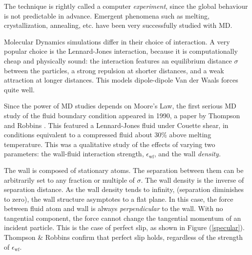\documentclass[12pt, a4paper, twoside, openright]{book}
\newcommand{\ewf}{\ensuremath{\epsilon_{\mathrm{wf}}}}
\begin{document}
The technique is rightly called a computer \emph{experiment}, since the global behaviour is not predictable in advance.  Emergent phenomena such as melting, crystallization, annealing, etc. have been very successfully studied with MD.

Molecular Dynamics simulations differ in their choice of interaction. A very popular choice is the Lennard-Jones interaction, because it is computationally cheap and physically sound: the interaction features an equilibrium distance $\sigma$ between the particles, a strong repulsion at shorter distances, and a weak attraction at longer distances.  This models dipole-dipole Van der Waals forces quite well.

\vspace*{1em}

Since the power of MD studies depends on Moore's Law, the first serious MD study of the fluid boundary condition appeared in 1990, a paper %
by Thompson and Robbins \cite{ThompsonRobbins1990}.
This featured a Lennard-Jones fluid under Couette shear, in conditions equivalent to a compressed fluid about 30\% above melting temperature. This was a qualitative study of the effects of varying two parameters: the wall-fluid interaction strength, \ewf, and the wall \emph{density.}

The wall is composed of stationary atoms. The separation between them can be arbitrarily set to any fraction or multiple of $\sigma$. The wall density is the inverse of separation distance. As the wall density tends to infinity, (separation diminishes to zero), the wall structure asymptotes to a flat plane. In this case, the force between fluid atom and wall is always \emph{perpendicular} to the wall. 
With no tangential component, the force cannot change the tangential momentum of an incident particle.  This is the case of perfect slip, as shown in Figure (\ref{specular}).
Thompson \& Robbins confirm that perfect slip holds, regardless of the strength of \ewf.
\end{document}

